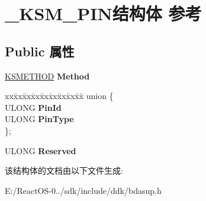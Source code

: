 \hypertarget{struct___k_s_m___p_i_n}{}\section{\+\_\+\+K\+S\+M\+\_\+\+P\+I\+N结构体 参考}
\label{struct___k_s_m___p_i_n}
\subsection*{Public 属性}
\begin{DoxyCompactItemize}
\item 
\mbox{\label{struct___k_s_m___p_i_n_a14ab51b08f7b6a76b159019192e98304}} 
\hyperlink{struct_k_s_i_d_e_n_t_i_f_i_e_r}{K\+S\+M\+E\+T\+H\+OD} {\bfseries Method}
\item 
\mbox{\label{struct___k_s_m___p_i_n_a6f8c9e37a38eb9b3f14eeb004fe4dccb}} 
\begin{tabbing}
xx\=xx\=xx\=xx\=xx\=xx\=xx\=xx\=xx\=\kill
union \{\\
\>ULONG {\bfseries PinId}\\
\>ULONG {\bfseries PinType}\\
\}; \\

\end{tabbing}\item 
\mbox{\label{struct___k_s_m___p_i_n_a7ca4e9a774d6c5283581b766ad597622}} 
U\+L\+O\+NG {\bfseries Reserved}
\end{DoxyCompactItemize}


该结构体的文档由以下文件生成\+:\begin{DoxyCompactItemize}
\item 
E\+:/\+React\+O\+S-\/0../sdk/include/ddk/bdasup.\+h\end{DoxyCompactItemize}
